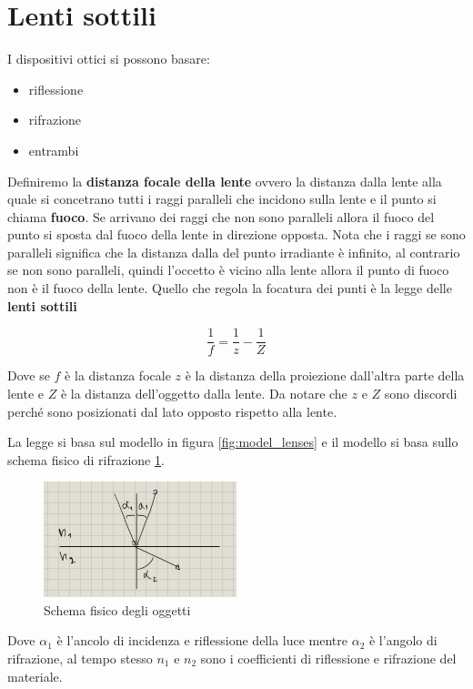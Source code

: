 \section{Lenti sottili}
I dispositivi ottici si possono basare:
\begin{itemize}
    \item riflessione
    \item rifrazione
    \item entrambi
\end{itemize}

Definiremo la \textbf{distanza focale della lente} ovvero la distanza dalla lente 
alla quale si concetrano tutti i raggi paralleli che incidono sulla lente e il 
punto si chiama \textbf{fuoco}. Se arrivano dei raggi che non sono paralleli allora 
il fuoco del punto si sposta dal fuoco della lente in direzione opposta. Nota che 
i raggi se sono paralleli significa che la distanza dalla del punto irradiante è 
infinito, al contrario se non sono paralleli, quindi l'occetto è vicino alla lente 
allora il punto di fuoco non è il fuoco della lente. Quello che regola la focatura 
dei punti è la legge delle \textbf{lenti sottili} 

$$\frac{1}{f} = \frac{1}{z} - \frac{1}{Z}$$

Dove se $f$ è la distanza focale $z$ è la distanza della proiezione dall'altra parte 
della lente e $Z$ è la distanza dell'oggetto dalla lente. Da notare che $z$ e $Z$
sono discordi perché sono posizionati dal lato opposto rispetto alla lente.


La legge si basa sul modello in figura \ref{fig:model_lenses} e il modello si basa 
sullo schema fisico di rifrazione \ref{fig:physical_lenses}.

\begin{figure}
    \centering
    \includegraphics[width=0.5\textwidth]{figure/lenti_fisica.jpg}
    \caption{Schema fisico degli oggetti}
    \label{fig:physical_lenses}
\end{figure}

Dove $\alpha_1$ è l'ancolo di incidenza e riflessione della luce mentre $\alpha_2$
è l'angolo di rifrazione, al tempo stesso $n_1$ e $n_2$ sono i coefficienti di 
riflessione e rifrazione del materiale.

